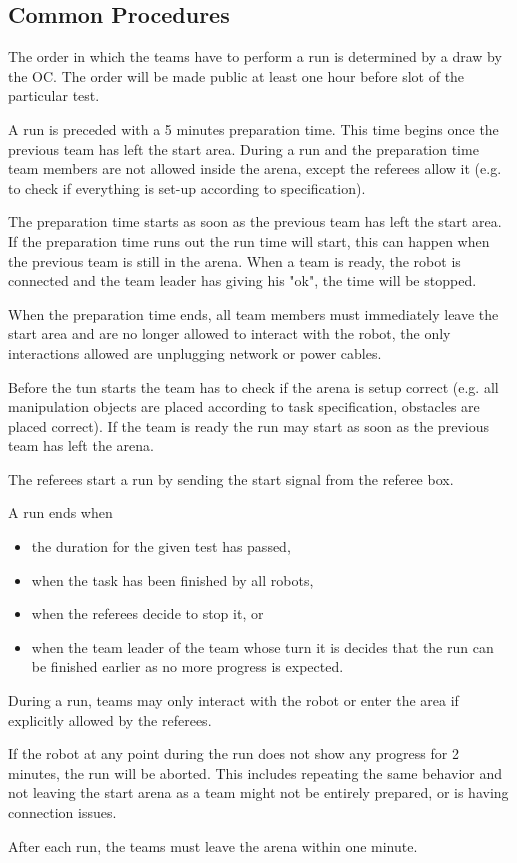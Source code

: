 \subsection{Common Procedures} 
The order in which the teams have to perform a run is determined by a draw by the OC. The order will be made public at least one hour before slot of the particular test.
\par
A run is preceded with a 5 minutes preparation time. This time begins once the previous team has left the start area.
During a run and the preparation time team members are not allowed inside the arena, except the referees allow it (e.g. to check if everything is set-up according to specification).
\par
The preparation time starts as soon as the previous team has left the start area. If the preparation time runs out the run time will start, this can happen when the previous team is still in the arena. When a team is ready, the robot is connected and the team leader has giving his "ok", the time will be stopped. 
\par
When the preparation time ends, all team members must immediately leave the start area and are no longer allowed to interact with the robot, the only interactions allowed are unplugging network or power cables.

\par 
Before the tun starts the team has to check if the arena is setup correct (e.g. all manipulation objects are placed according to task specification, obstacles are placed correct). If the team is ready the run may start as soon as the previous team has left the arena.
\par 


The referees start a run by sending the start signal from the referee box.
\par
A run ends when 
\begin{itemize}
	\item the duration for the given test has passed,
	\item when the task has been finished by all robots,
	\item when the referees decide to stop it, or 
	\item when the team leader of the team whose turn it is decides that the run can be finished earlier as no more progress is expected.
\end{itemize}
\par
During a run, teams may only interact with the robot or enter the area if explicitly allowed by the referees.
\par
If the robot at any point during the run does not show any progress for 2 minutes, the run will be aborted. This includes repeating the same behavior and not leaving the start arena as a team might not be entirely prepared, or is having connection issues.
\par
After each run, the teams must leave the arena within one minute.


